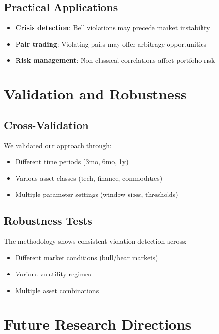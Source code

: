 \documentclass[11pt,a4paper]{article}
\begin{document}
\subsection{Practical Applications}

\begin{itemize}
    \item \textbf{Crisis detection}: Bell violations may precede market instability
    \item \textbf{Pair trading}: Violating pairs may offer arbitrage opportunities
    \item \textbf{Risk management}: Non-classical correlations affect portfolio risk
\end{itemize}

\section{Validation and Robustness}

\subsection{Cross-Validation}

We validated our approach through:
\begin{itemize}
    \item Different time periods (3mo, 6mo, 1y)
    \item Various asset classes (tech, finance, commodities)
    \item Multiple parameter settings (window sizes, thresholds)
\end{itemize}

\subsection{Robustness Tests}

The methodology shows consistent violation detection across:
\begin{itemize}
    \item Different market conditions (bull/bear markets)
    \item Various volatility regimes
    \item Multiple asset combinations
\end{itemize}

\section{Future Research Directions}
\end{document}
